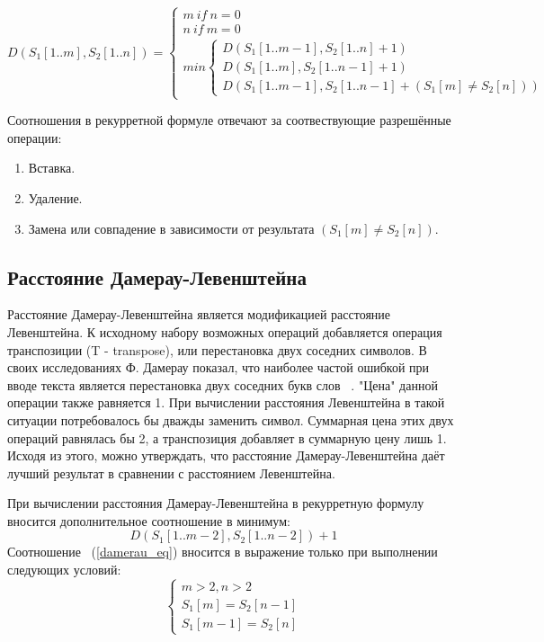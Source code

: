 \documentclass[12pt, a4paper]{report}
\begin{document}
	\begin{equation}
	\label{formula_leven}
	D(S_{1}[1..m], S_{2}[1..n]) =
		\begin{cases}
		m\ if\ n = 0\\
		n\ if\ m = 0\\
		min \begin{cases}
		D(S_{1}[1..m-1], S_{2}[1..n] + 1)\\
		D(S_{1}[1..m], S_{2}[1..n-1]+1)\\
		D(S_{1}[1..m-1], S_{2}[1..n-1]+(S_{1}[m] \neq S_{2}[n]))
		\end{cases}
	\end{cases}
	\end{equation}
	
	Соотношения в рекурретной формуле отвечают за соотвествующие разрешённые операции:
	\begin{enumerate}
		\item Вставка.
		\item Удаление.
		\item Замена или совпадение в зависимости от результата $(S_{1}[m] \neq S_{2}[n])$.	
	\end{enumerate}

	\subsection{Расстояние Дамерау-Левенштейна}
	Расстояние Дамерау-Левенштейна является модификацией расстояние Левенштейна. К исходному набору возможных операций добавляется операция транспозиции (T - transpose), или перестановка двух соседних символов. В своих исследованиях Ф. Дамерау показал, что наиболее частой ошибкой при вводе текста является перестановка двух соседних букв слов ~\cite{damerau}. "Цена" данной операции также равняется 1. При вычислении расстояния Левенштейна в такой ситуации потребовалось бы дважды заменить символ. Суммарная цена этих двух операций равнялась бы 2, а транспозиция добавляет в суммарную цену лишь 1. Исходя из этого, можно утверждать, что расстояние Дамерау-Левенштейна даёт лучший результат в сравнении с расстоянием Левенштейна.
	
	При вычислении расстояния Дамерау-Левенштейна в рекурретную формулу вносится дополнительное соотношение в минимум:
	\begin{equation}
	\label{damerau_eq}
	D(S_{1}[1..m-2], S_{2}[1..n-2])+1
	\end{equation}
	Соотношение ~(\ref{damerau_eq}) вносится в выражение только при выполнении следующих условий:
	\begin{equation}
	\label{damerau_conditions}
	\begin{cases}
		m > 2,n > 2\\
		S_{1}[m] = S_{2}[n-1]\\
		S_{1}[m-1] = S_{2}[n]
	\end{cases}	
	\end{equation}
	
\end{document}
